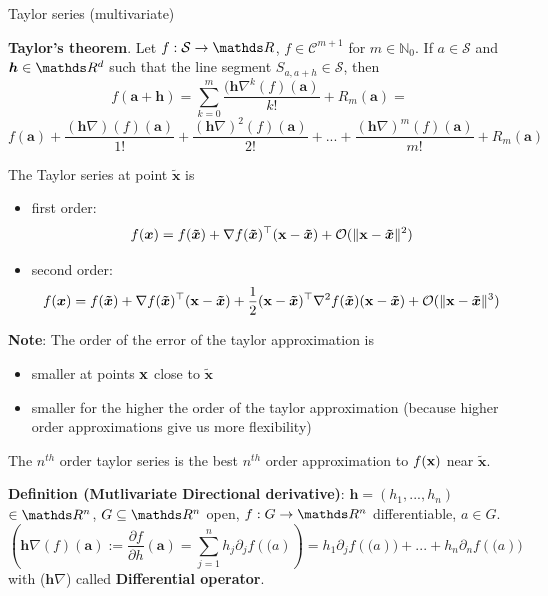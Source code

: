 \begin{vbframe}{Taylor series (multivariate)}

    \textbf{Taylor's theorem}. Let $f: \mathcal{S} \to \R$, $f \in \mathcal{C}^{m + 1}$ for $m \in \mathbb{N}_0$. If $a \in \mathcal{S}$ and $\bm{h} \in \R^d$ such that the line segment $S_{a, a + h} \in \mathcal{S}$, then
    $$f(\bm{a+h}) = \sum_{k=0}^{m} \frac{(\bm{h}\nabla^{k}(f)(\bm{a})}{k!} + R_{m}(\bm{a}) = $$
    $$f(\bm{a}) + \frac{(\bm{h}\nabla)(f)(\bm{a})}{1!} + \frac{(\bm{h}\nabla)^{2}(f)(\bm{a})}{2!} + ... + \frac{(\bm{h}\nabla)^{m}(f)(\bm{a})}{m!} + R_{m}(\bm{a})$$


  The Taylor series at point $\bm{\tilde x}$ is
  
  \begin{itemize}
    \item first order: 
    $$
    f(\bm{x}) = f(\bm{\tilde{x}}) + \nabla f(\bm{\tilde{x}})^\top(\mathbf{x}-\bm{\tilde{x}}) + \mathcal{O}(\|\mathbf{x} - \bm{\tilde{x}}\|^2) 
    $$
    \item second order: 
    $$
    f(\bm{x}) = f(\bm{\tilde{x}}) + \nabla f(\bm{\tilde{x}})^\top(\mathbf{x}-\bm{\tilde{x}}) +
    \frac 12(\mathbf{x}-\bm{\tilde{x}})^\top\nabla^2 f(\bm{\tilde{x}})(\mathbf{x}-\bm{\tilde{x}}) + \mathcal{O}(\|\mathbf{x} - \bm{\tilde{x}}\|^3)
    $$
  \end{itemize}
  
  \textbf{Note}: The order of the error of the taylor approximation is 
  \begin{itemize}
    \item smaller at points $\mathbf{x}$ close to $\bm{\tilde x}$
    \item smaller for the higher the order of the taylor approximation (because higher order approximations give us more flexibility)
  \end{itemize}
  
  The $n^{th}$ order taylor series is the best $n^{th}$ order approximation to $f(\mathbf{x})$ near $\bm{\tilde{x}}$. 
  
  \framebreak

    \textbf{Definition (Mutlivariate Directional derivative)}: $\bm{h} = (h_{1}, ..., h_{n})$ $\in \R^{n}$, $G \subseteq \R^{n}$ open, $f : G \rightarrow \R^{n}$ differentiable, $a \in G$.
    $$(\bm{h}\nabla(f)(\bm{a}) := \frac{\partial f}{\partial h}(\bm{a}) = \sum_{j=1}^{n} h_{j}\partial_{j}f(\bm(a)) = h_{1}\partial_{j}f(\bm(a)) + ... + h_{n}\partial_{n}f(\bm(a))$$
    with ($\bm{h}\nabla$) called \textbf{Differential operator}.
    
    \vspace*{0.2cm}
    

\end{vbframe}
